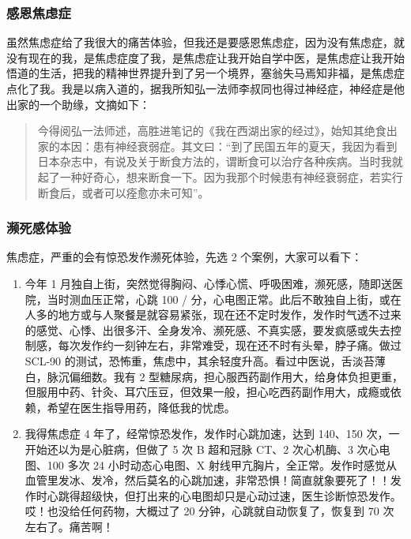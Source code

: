 \documentclass{ctexart}
\begin{document}
\subsubsection{感恩焦虑症}

虽然焦虑症给了我很大的痛苦体验，但我还是要感恩焦虑症，因为没有焦虑症，就没有现在的我，是焦虑症度了我，是焦虑症让我开始自学中医，是焦虑症让我开始悟道的生活，把我的精神世界提升到了另一个境界，塞翁失马焉知非福，是焦虑症点化了我。我是以病入道的，据我所知弘一法师李叔同也得过神经症，神经症是他出家的一个助缘，文摘如下：

\begin{quote}
    今得阅弘一法师述，高胜进笔记的《我在西湖出家的经过》，始知其绝食出家的本因：患有神经衰弱症。其文曰：“到了民国五年的夏天，我因为看到日本杂志中，有说及关于断食方法的，谓断食可以治疗各种疾病。当时我就起了一种好奇心，想来断食一下。因为我那个时候患有神经衰弱症，若实行断食后，或者可以痊愈亦未可知”。
\end{quote}

\subsubsection{濒死感体验}

焦虑症，严重的会有惊恐发作濒死体验，先选 2 个案例，大家可以看下：

\begin{enumerate}
    \item 今年 1 月独自上街，突然觉得胸闷、心悸心慌、呼吸困难，濒死感，随即送医院，当时测血压正常，心跳 100 / 分，心电图正常。此后不敢独自上街，或在人多的地方或与人聚餐是就容易紧张，现在还不定时发作，发作时气透不过来的感觉、心悸、出很多汗、全身发冷、濒死感、不真实感，要发疯感或失去控制感，每次发作约一刻钟左右，非常难受，现在还不时有头晕，脖子痛。做过 SCL-90 的测试，恐怖重，焦虑中，其余轻度升高。看过中医说，舌淡苔薄白，脉沉偏细数。我有 2 型糖尿病，担心服西药副作用大，给身体负担更重，但服用中药、针灸、耳穴压豆，但效果一般，担心吃西药副作用大，成瘾或依赖，希望在医生指导用药，降低我的忧虑。
    \item 我得焦虑症 4 年了，经常惊恐发作，发作时心跳加速，达到 140、150 次，一开始还以为是心脏病，但做了 5 次 B 超和冠脉 CT、2 次心机酶、3 次心电图、100 多次 24 小时动态心电图、X 射线甲亢胸片，全正常。发作时感觉从血管里发冰、发冷，然后莫名的心跳加速，非常恐惧！简直就象要死了！！发作时心跳得超级快，但打出来的心电图却只是心动过速，医生诊断惊恐发作。哎！也没给任何药物，大概过了 20 分钟，心跳就自动恢复了，恢复到 70 次左右了。痛苦啊！
\end{enumerate}
\end{document}
